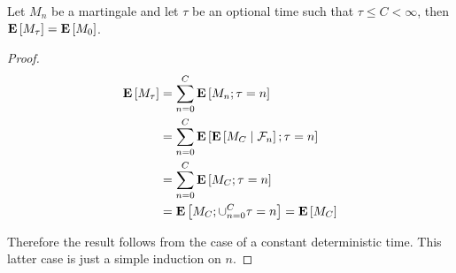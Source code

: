 \begin{lem}\label{ExpectationStoppedMartingaleDiscrete}Let $M_n$ be a martingale and let $\tau$ be an optional
  time such that $\tau \leq C < \infty$, then $\expectation{M_\tau} =
  \expectation{M_0}$.
\end{lem}
\begin{proof}
\begin{align*}
\expectation{M_\tau} &= \sum_{n=0}^C \expectation{M_n ; \tau=n} \\
&=\sum_{n=0}^C \expectation{\cexpectationlong{\mathcal{F}_n}{M_C} ;
  \tau=n} \\
&=\sum_{n=0}^C \expectation{M_C ;
  \tau=n} \\
&=\expectation{M_C ;
  \cup_{n=0}^C \tau=n} = \expectation{M_C}\\
\end{align*}

Therefore the result follows from the case of a constant deterministic
time.  This latter case is just a simple induction on $n$.
\end{proof}


